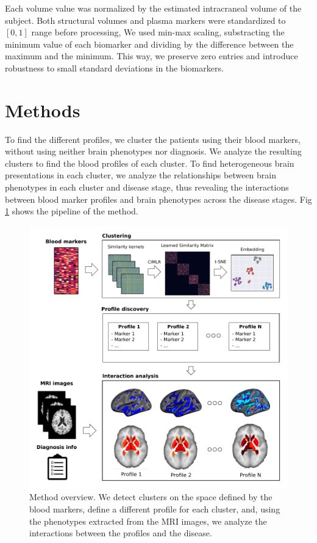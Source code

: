 Each volume value was normalized by the estimated intracraneal volume of the subject. Both structural volumes and plasma markers were standardized to $[0,1]$ range before processing, We used min-max scaling, substracting the minimum value of each biomarker and dividing by the difference between the maximum and the minimum. This way, we preserve zero entries and introduce robustness to small standard deviations in the biomarkers.\\

\section{Methods}
\label{methods}

To find the different profiles, we cluster the patients using their blood markers, without using neither brain phenotypes nor diagnosis. We analyze the resulting clusters to find the blood profiles of each cluster. To find heterogeneous brain presentations in each cluster, we analyze the relationships between brain phenotypes in each cluster and disease stage, thus revealing the interactions between blood marker profiles and brain phenotypes across the disease stages. Fig \ref{figmethod} shows the pipeline of the method. \\

\begin{figure}[!htbp]
\centering
 \includegraphics[width=1.0\textwidth]{figures/cimlr/figure_1_new.pdf}
    \caption[Method overview.]{Method overview. We detect clusters on the space defined by the blood markers, define a different profile for each cluster, and, using the phenotypes extracted from the MRI images, we analyze the interactions between the profiles and the disease.}
    \label{figmethod}
\end{figure}

